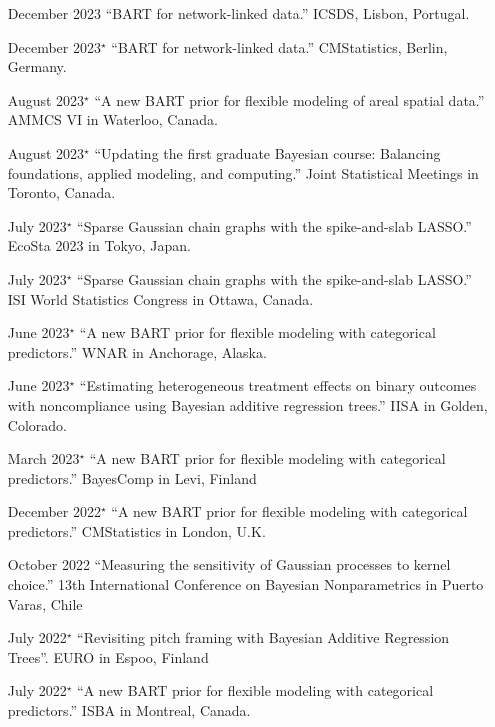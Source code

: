 \documentclass[margin]{res}
\begin{document}
\begin{resume}
{\begin{itemize}
\item[December 2023]{``BART for network-linked data.'' ICSDS, Lisbon, Portugal.}

\item[December 2023$^{\star}$]{``BART for network-linked data.'' CMStatistics, Berlin, Germany.}

\item[August 2023$^{\star}$]{``A new BART prior for flexible modeling of areal spatial data.'' AMMCS VI in Waterloo, Canada.}

\item[August 2023$^{\star}$]{``Updating the first graduate Bayesian course: Balancing foundations, applied modeling, and computing.'' Joint Statistical Meetings in Toronto, Canada.}

\item[July 2023$^{\star}$]{``Sparse Gaussian chain graphs with the spike-and-slab LASSO.'' EcoSta 2023 in Tokyo, Japan.}

\item[July 2023$^{\star}$]{``Sparse Gaussian chain graphs with the spike-and-slab LASSO.'' ISI World Statistics Congress in Ottawa, Canada.}

\item[June 2023$^{\star}$]{``A new BART prior for flexible modeling with categorical predictors.'' WNAR in Anchorage, Alaska.}

\item[June 2023$^{\star}$]{``Estimating heterogeneous treatment effects on binary outcomes with noncompliance using Bayesian additive regression trees.'' IISA in Golden, Colorado.}

\item[March 2023$^{\star}$]{``A new BART prior for flexible modeling with categorical predictors.'' BayesComp in Levi, Finland}

\item[December 2022$^{\star}$]{``A new BART prior for flexible modeling with categorical predictors.'' CMStatistics in London, U.K.}

\item[October 2022]{``Measuring the sensitivity of Gaussian processes to kernel choice.'' 13th International Conference on Bayesian Nonparametrics in Puerto Varas, Chile}

\item[July 2022$^{\star}$]{``Revisiting pitch framing with Bayesian Additive Regression Trees''. EURO in Espoo, Finland}

\item[July 2022$^{\star}$]{``A new BART prior for flexible modeling with categorical predictors.'' ISBA in Montreal, Canada.}


\end{itemize}}
\end{resume}
\end{document}
